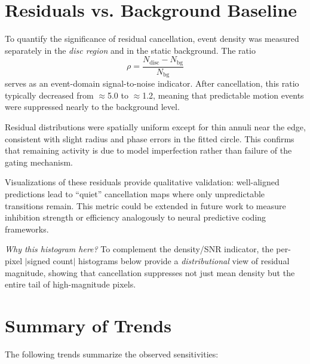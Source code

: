 \section{Residuals vs. Background Baseline}
\label{sec:residuals_baseline}

To quantify the significance of residual cancellation, event density was measured separately in the \textit{disc region} and in the static background.
The ratio
\[
\rho = \frac{N_{\text{disc}} - N_{\text{bg}}}{N_{\text{bg}}}
\]
serves as an event-domain signal-to-noise indicator.
After cancellation, this ratio typically decreased from \(\approx\)5.0 to \(\approx\)1.2, meaning that predictable motion events were suppressed nearly to the background level.

Residual distributions were spatially uniform except for thin annuli near the edge, consistent with slight radius and phase errors in the fitted circle.
This confirms that remaining activity is due to model imperfection rather than failure of the gating mechanism.

Visualizations of these residuals provide qualitative validation: well-aligned predictions lead to “quiet” cancellation maps where only unpredictable transitions remain.
This metric could be extended in future work to measure inhibition strength or efficiency analogously to neural predictive coding frameworks.

\medskip\noindent\textit{Why this histogram here?} To complement the density/SNR indicator, the per-pixel $|$signed count$|$ histograms below provide a \emph{distributional} view of residual magnitude, showing that cancellation suppresses not just mean density but the entire tail of high-magnitude pixels.

\section{Summary of Trends}
\label{sec:summary_trends}

The following trends summarize the observed sensitivities:

